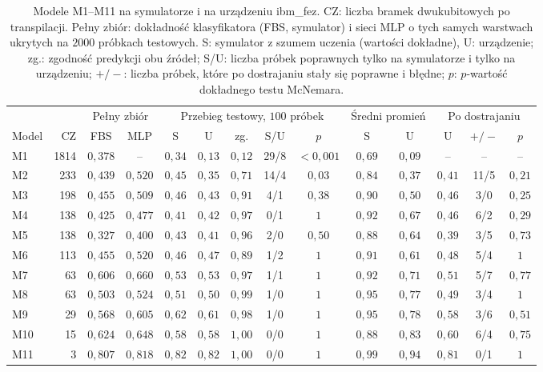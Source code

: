 \begin{table}[htb]
\centering
\caption[Modele M1--M11 na symulatorze i na urządzeniu ibm\_fez przed dostrajaniem i po nim]{Modele M1--M11 na symulatorze i na urządzeniu ibm\_fez. CZ: liczba bramek dwukubitowych po transpilacji. Pełny zbiór: dokładność klasyfikatora (FBS, symulator) i sieci MLP o tych samych warstwach ukrytych na $2000$ próbkach testowych. S: symulator z szumem uczenia (wartości dokładne), U: urządzenie; zg.: zgodność predykcji obu źródeł; S/U: liczba próbek poprawnych tylko na symulatorze i tylko na urządzeniu; $+/-$: liczba próbek, które po dostrajaniu stały się poprawne i błędne; $p$: $p$-wartość dokładnego testu McNemara.}
\label{tab:cls:hw-results}
\footnotesize
\setlength{\tabcolsep}{3.6pt}
\begin{tabular}{@{}lrcccccccccccc@{}}
\toprule
 & & \multicolumn{2}{c}{Pełny zbiór} & \multicolumn{5}{c}{Przebieg testowy, $100$ próbek} & \multicolumn{2}{c}{Średni promień} & \multicolumn{3}{c}{Po dostrajaniu} \\
\cmidrule(lr){3-4}\cmidrule(lr){5-9}\cmidrule(lr){10-11}\cmidrule(l){12-14}
Model & CZ & FBS & MLP & S & U & zg. & S/U & $p$ & S & U & U & $+/-$ & $p$ \\
\midrule
M1 & 1814 & $0{,}378$ & -- & $0{,}34$ & $0{,}13$ & $0{,}12$ & 29/8 & $<0{,}001$ & $0{,}69$ & $0{,}09$ & -- & -- & -- \\
M2 & 233 & $0{,}439$ & $0{,}520$ & $0{,}45$ & $0{,}35$ & $0{,}71$ & 14/4 & $0{,}03$ & $0{,}84$ & $0{,}37$ & $0{,}41$ & 11/5 & $0{,}21$ \\
M3 & 198 & $0{,}455$ & $0{,}509$ & $0{,}46$ & $0{,}43$ & $0{,}91$ & 4/1 & $0{,}38$ & $0{,}90$ & $0{,}50$ & $0{,}46$ & 3/0 & $0{,}25$ \\
M4 & 138 & $0{,}425$ & $0{,}477$ & $0{,}41$ & $0{,}42$ & $0{,}97$ & 0/1 & $1$ & $0{,}92$ & $0{,}67$ & $0{,}46$ & 6/2 & $0{,}29$ \\
M5 & 138 & $0{,}327$ & $0{,}400$ & $0{,}43$ & $0{,}41$ & $0{,}96$ & 2/0 & $0{,}50$ & $0{,}88$ & $0{,}64$ & $0{,}39$ & 3/5 & $0{,}73$ \\
M6 & 113 & $0{,}455$ & $0{,}520$ & $0{,}46$ & $0{,}47$ & $0{,}89$ & 1/2 & $1$ & $0{,}91$ & $0{,}61$ & $0{,}48$ & 5/4 & $1$ \\
M7 & 63 & $0{,}606$ & $0{,}660$ & $0{,}53$ & $0{,}53$ & $0{,}97$ & 1/1 & $1$ & $0{,}92$ & $0{,}71$ & $0{,}51$ & 5/7 & $0{,}77$ \\
M8 & 63 & $0{,}503$ & $0{,}524$ & $0{,}51$ & $0{,}50$ & $0{,}99$ & 1/0 & $1$ & $0{,}95$ & $0{,}77$ & $0{,}49$ & 3/4 & $1$ \\
M9 & 29 & $0{,}568$ & $0{,}605$ & $0{,}62$ & $0{,}61$ & $0{,}98$ & 1/0 & $1$ & $0{,}95$ & $0{,}78$ & $0{,}58$ & 3/6 & $0{,}51$ \\
M10 & 15 & $0{,}624$ & $0{,}648$ & $0{,}58$ & $0{,}58$ & $1{,}00$ & 0/0 & $1$ & $0{,}88$ & $0{,}83$ & $0{,}60$ & 6/4 & $0{,}75$ \\
M11 & 3 & $0{,}807$ & $0{,}818$ & $0{,}82$ & $0{,}82$ & $1{,}00$ & 0/0 & $1$ & $0{,}99$ & $0{,}94$ & $0{,}81$ & 0/1 & $1$ \\
\bottomrule
\end{tabular}
\end{table}
